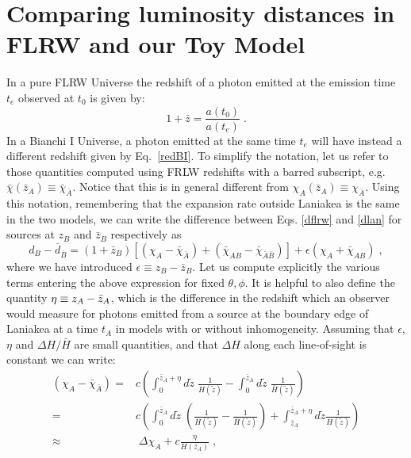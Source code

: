 \documentclass[notitlepage,nofootinbib]{revtex4-1}
\begin{document}
\section{Comparing luminosity distances in FLRW and our Toy Model}\label{appA}
In a pure FLRW Universe the redshift of a photon emitted at the emission time $t_e$ observed at $t_0$ is given by:
\begin{equation}
1+\bar{z} = \frac{a(t_0)}{a(t_e)}\;.    
\end{equation}
In a Bianchi I Universe, a photon emitted at the same time $t_e$ will have instead a different redshift given by Eq.~\eqref{redBI}.
To simplify the notation, let us refer to those quantities computed using FRLW redshifts with a barred subscript, e.g. $\bar{\chi}(\bar{z}_A)\equiv\bar{\chi}_{\bar{A}}$. Notice that this is in general different from $\chi_A(\bar{z}_A)\equiv \chi_{\bar{A}}$. Using this notation, remembering that the expansion rate outside Laniakea is the same in the two models, we can write the difference between Eqs. \eqref{dflrw} and \eqref{dlan} for sources at $z_B$ and $\bar{z}_B$ respectively as
\begin{equation}\label{d-dcomp}
    d_B - \bar{d}_{\bar{B}} = \left(1+\bar{z}_B \right)\left[\left(\chi_A-\bar{\chi}_{\bar{A}}\right) + \left(\bar{\chi}_{AB} -\bar{\chi}_{\bar{A}\bar{B}}\right)\right] + \epsilon\left(\chi_A + \bar{\chi}_{AB} \right)\;,
\end{equation}
where we have introduced $\epsilon\equiv z_B -\bar{z}_B$. Let us compute explicitly the various terms entering the above expression for fixed $\theta,\phi$. It is helpful to also define the quantity $\eta\equiv z_A - \Bar{z}_A$, which is the difference in the redshift which an observer would measure for photons emitted from a source at the boundary edge of Laniakea at a time $t_A$ in models with or without inhomogeneity. Assuming that $\epsilon$, $\eta$ and $\Delta H/\bar{H}$ are small quantities, and that $\Delta H$ along each line-of-sight is constant we can write: 
\begin{equation}\label{firstterm}
\begin{split}
\left(\chi_A -\bar{\chi}_{\bar{A}}\right)=& c\left(\int_0^{\bar{z}_A + \eta}d\tilde{z}\; \frac{1}{H(\tilde{z})} -\int_0^{\bar{z}_A}d\tilde{z}\; \frac{1}{\bar{H}(\tilde{z})} \right)\\
 =& c\left(\int_0^{\bar{z}_A}d\tilde{z}\; \left(\frac{1}{H(\tilde{z})}-\frac{1}{\bar{H}(\tilde{z})}\right) + \int_{\bar{z}_A}^{\bar{z}_A + \eta}d\tilde{z}\frac{1}{H(\tilde{z})}\right)\\
 \approx& \; \Delta \chi_{A} + c\frac{\eta}{H(\bar{z}_A)}\;, 
\end{split}
\end{equation}
\end{document}
